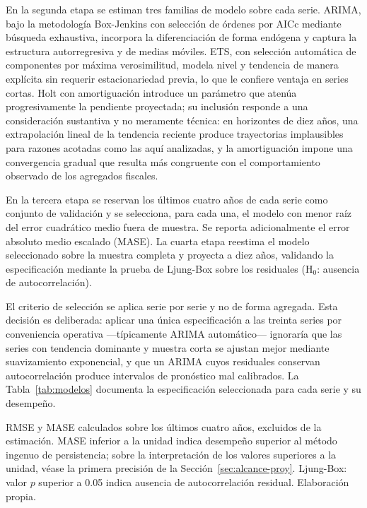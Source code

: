 \documentclass[12pt, letterpaper]{article}
\begin{document}
En la segunda etapa se estiman tres familias de modelo sobre cada serie. ARIMA, bajo
la metodología Box-Jenkins con selección de órdenes por AICc mediante búsqueda
exhaustiva, incorpora la diferenciación de forma endógena y captura la estructura
autorregresiva y de medias móviles. ETS, con selección automática de componentes por
máxima verosimilitud, modela nivel y tendencia de manera explícita sin requerir
estacionariedad previa, lo que le confiere ventaja en series cortas. Holt con
amortiguación introduce un parámetro que atenúa progresivamente la pendiente
proyectada; su inclusión responde a una consideración sustantiva y no meramente
técnica: en horizontes de diez años, una extrapolación lineal de la tendencia reciente
produce trayectorias implausibles para razones acotadas como las aquí analizadas, y la
amortiguación impone una convergencia gradual que resulta más congruente con el
comportamiento observado de los agregados fiscales.

En la tercera etapa se reservan los últimos cuatro años de cada serie como conjunto de validación y se selecciona, para cada una, el modelo con menor raíz del error cuadrático
medio fuera de muestra. Se reporta adicionalmente el error absoluto medio escalado
(MASE). La cuarta etapa reestima el modelo seleccionado sobre la muestra completa
y proyecta a diez años, validando la especificación mediante la prueba de Ljung-Box
sobre los residuales (H$_0$: ausencia de autocorrelación).

El criterio de selección se aplica serie por serie y no de forma agregada. Esta decisión es deliberada: aplicar una única especificación a las treinta series por
conveniencia operativa —típicamente ARIMA automático— ignoraría que las series con
tendencia dominante y muestra corta se ajustan mejor mediante suavizamiento exponencial,
y que un ARIMA cuyos residuales conservan autocorrelación produce intervalos de
pronóstico mal calibrados. La Tabla~\ref{tab:modelos} documenta la especificación
seleccionada para cada serie y su desempeño.

\begin{table}[htbp]
  \centering
  \caption{Modelo seleccionado por serie, desempeño fuera de muestra y diagnóstico
  de residuales.}
  \label{tab:modelos}
  

  \vspace{2pt}
  \footnotesize
  RMSE y MASE calculados sobre los últimos cuatro años, excluidos de la estimación.
  MASE inferior a la unidad indica desempeño superior al método ingenuo de
  persistencia; sobre la interpretación de los valores superiores a la unidad,
  véase la primera precisión de la Sección~\ref{sec:alcance-proy}. Ljung-Box:
  valor $p$ superior a 0.05 indica ausencia de autocorrelación residual.
  Elaboración propia.
\end{table}
\end{document}

